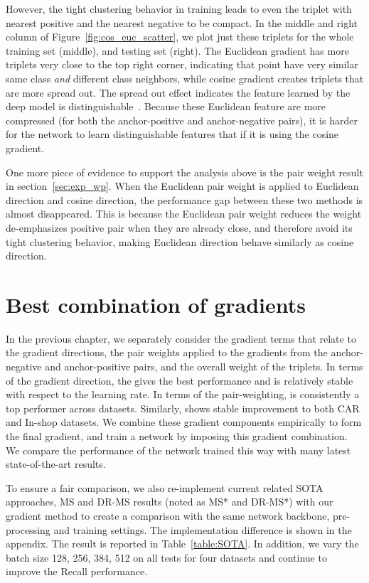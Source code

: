 \documentclass[10pt,twocolumn,letterpaper]{article}
\begin{document}
However, the tight clustering behavior in training leads to even the triplet with nearest positive and the nearest negative to be compact. In the middle and right column of Figure~\ref{fig:cos_euc_scatter}, we plot just these triplets for the whole training set (middle), and testing set (right). The Euclidean gradient has more triplets very close to the top right corner, indicating that point have very similar same class {\em and} different class neighbors, while cosine gradient creates triplets that are more spread out. The spread out effect indicates the feature learned by the deep model is distinguishable~\cite{Zhang_2017_ICCV,Wu_2018_CVPR,Xuan_2020_WACV}. Because these Euclidean feature are more compressed (for both the anchor-positive and anchor-negative pairs), it is harder for the network to learn distinguishable features that if it is using the cosine gradient.

One more piece of evidence to support the analysis above is the pair weight result in section~\ref{sec:exp_wp}. When the Euclidean pair weight  is applied to Euclidean direction and cosine direction, the performance gap between these two methods is almost disappeared. This is because the Euclidean pair weight  reduces the weight de-emphasizes positive pair when they are already close, and therefore avoid its tight clustering behavior, making Euclidean direction behave similarly as cosine direction.

\section{Best combination of gradients}

In the previous chapter, we separately consider the gradient terms that relate to the gradient directions, the pair weights applied to the gradients from the anchor-negative and anchor-positive pairs, and the overall weight of the triplets.  In terms of the gradient direction, the  gives the best performance and is relatively stable with respect to the learning rate.  In terms of the pair-weighting,  is consistently a top performer across datasets.  Similarly,  shows stable improvement to both CAR and In-shop datasets. We combine these gradient components empirically to form the final gradient, and train a network by imposing this gradient combination.  We compare the performance of the network trained this way with many latest state-of-the-art results. 

To ensure a fair comparison, we also re-implement current related SOTA approaches, MS and DR-MS results (noted as MS* and DR-MS*) with our gradient method to create a comparison with the same network backbone, pre-processing and training settings. The implementation difference is shown in the appendix. The result is reported in Table~\ref{table:SOTA}.  In addition, we vary the batch size 128, 256, 384, 512 on all tests for four datasets and continue to improve the Recall performance. 
\end{document}
